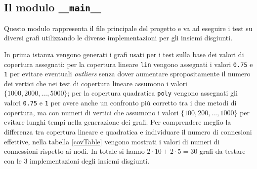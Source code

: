 \subsection{Il modulo \texttt{\_\_main\_\_}}
Questo modulo rappresenta il file principale del progetto e va ad eseguire i test su diversi grafi utilizzando
le diverse implementazioni per gli insiemi disgiunti.\newline

In prima istanza vengono generati i grafi usati per i test sulla base dei valori di copertura assegnati: per la copertura lineare \texttt{lin}
vengono assegnati i valori \texttt{0.75} e \texttt{1} per evitare eventuali \textit{outliers} senza dover aumentare spropositamente il numero dei vertici
che nei test di copertura lineare assumono i valori $\{1000, 2000, \ldots, 5000\}$; per la copertura quadratica \texttt{poly} vengono assegnati
gli valori \texttt{0.75} e \texttt{1} per avere anche un confronto più corretto tra i due metodi di copertura, ma con numeri di vertici che
assumono i valori $\{100, 200, \ldots, 1000\}$ per evitare lunghi tempi nella generazione dei grafi. Per comprendere meglio la differenza tra copertura
lineare e quadratica e individuare il numero di connesioni effettive, nella tabella \ref{covTable} vengono mostrati i valori di numeri di connessioni
rispetto ai nodi. In totale si hanno $2 \cdot 10 + 2 \cdot 5 = 30$ grafi da testare con le 3 implementazioni degli insiemi disgiunti.\newline

